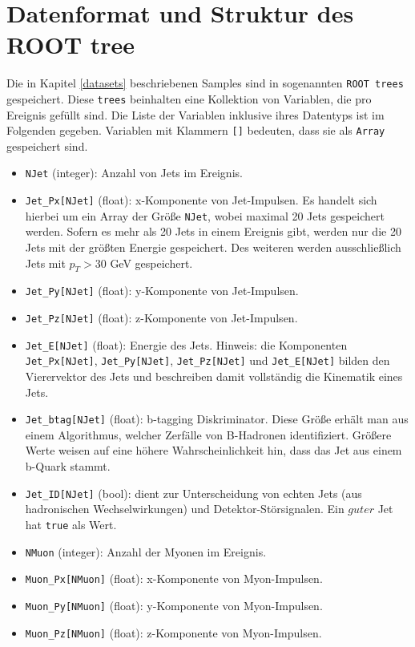 \section{Datenformat und Struktur des ROOT tree}
\label{dataformat}
Die in Kapitel \ref{datasets} beschriebenen Samples sind in sogenannten \texttt{ROOT trees} gespeichert. Diese \texttt{trees} beinhalten eine Kollektion von Variablen, die pro Ereignis gef\"ullt sind. Die Liste der Variablen inklusive ihres Datentyps ist im Folgenden gegeben. Variablen mit Klammern \texttt{[]} bedeuten, dass sie als \texttt{Array} gespeichert sind.
\begin{itemize}
	\item \texttt{NJet} (integer): Anzahl von Jets im Ereignis.
	\item \texttt{Jet\_Px[NJet]} (float): x-Komponente von Jet-Impulsen. Es handelt sich hierbei um ein Array der Gr\"o\ss{}e \texttt{NJet}, wobei maximal 20 Jets gespeichert werden. Sofern es mehr als 20 Jets in einem Ereignis gibt, werden nur die 20 Jets mit der gr\"o\ss{}ten Energie gespeichert. Des weiteren werden ausschlie\ss{}lich Jets mit $p_{T}>30$ GeV gespeichert.
	\item \texttt{Jet\_Py[NJet]} (float): y-Komponente von Jet-Impulsen.
	\item \texttt{Jet\_Pz[NJet]} (float): z-Komponente von Jet-Impulsen.
	\item \texttt{Jet\_E[NJet]} (float): Energie des Jets. Hinweis: die Komponenten \texttt{Jet\_Px[NJet]}, \texttt{Jet\_Py[NJet]}, \texttt{Jet\_Pz[NJet]} und \texttt{Jet\_E[NJet]} bilden den Vierervektor des Jets und beschreiben damit vollst\"andig die Kinematik eines Jets.
	\item \texttt{Jet\_btag[NJet]} (float): b-tagging Diskriminator. Diese Gr\"o\ss{}e erh\"alt man aus einem Algorithmus, welcher Zerf\"alle von B-Hadronen identifiziert. Gr\"o\ss{}ere Werte weisen auf eine h\"ohere Wahrscheinlichkeit hin, dass das Jet aus einem b-Quark stammt.
	\item \texttt{Jet\_ID[NJet]} (bool): dient zur Unterscheidung von echten Jets (aus hadronischen Wechselwirkungen) und Detektor-St\"orsignalen. Ein $guter$ Jet hat \texttt{true} als Wert.
	\item \texttt{NMuon} (integer): Anzahl der Myonen im Ereignis.
	\item \texttt{Muon\_Px[NMuon]} (float): x-Komponente von Myon-Impulsen.
	\item \texttt{Muon\_Py[NMuon]} (float): y-Komponente von Myon-Impulsen.
	\item \texttt{Muon\_Pz[NMuon]} (float): z-Komponente von Myon-Impulsen.

\end{itemize}
